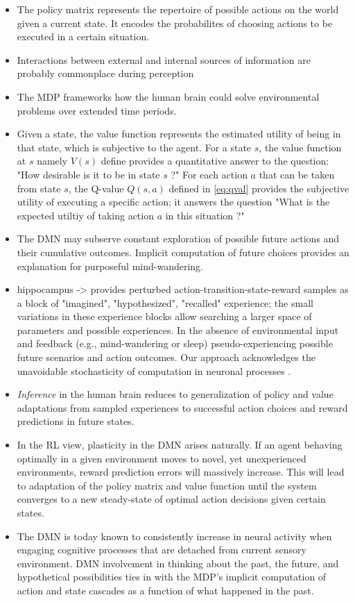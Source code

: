 \documentclass[10pt,letterpaper]{article}
\begin{document}
\begin{itemize}
  \item The policy matrix represents the repertoire of possible actions
  on the world given a current state. It encodes the probabilites of
  choosing actions to be executed in a certain situation.
  \item Interactions between external and internal sources of
  information are probably commonplace during perception
  \item The MDP frameworks how the human brain could solve
  environmental problems over extended time periods.
  \item Given a state, the value function represents the estimated utility of
  being in that state, which is subjective to the agent.
  For a state $s$, the value function at $s$ namely $V(s)$ define provides a quantitative answer to the question:
  "How desirable is it to be in state $s$ ?"
  For each action $a$ that can be taken from state $s$,
  the Q-value  $Q(s, a)$ defined in \eqref{eq:qval} provides the subjective
  utility of executing a specific action; it answers the question
  "What is the expected utiltiy of taking action $a$ in this situation ?"
  \item The DMN may subserve
  constant exploration of possible future actions and their
  cumulative outcomes. Implicit computation of future choices
  provides an explanation for purposeful mind-wandering.
  \item hippocampus -> provides perturbed action-transition-state-reward samples
  as a block of "imagined", "hypothesized", "recalled" experience;
  the small variations in these experience blocks allow searching
  a larger space of parameters and possible experiences.
  In the absence of environmental input and feedback
  (e.g., mind-wandering or sleep) pseudo-experiencing possible
  future scenarios and action outcomes.
  Our approach acknowledges the unavoidable stochasticity of
  computation in neuronal processes \citep{faisal2008noise}.
  \item
  \textit{Inference} in the human brain reduces to generalization of
  policy and value adaptations from sampled experiences to
  successful action choices and reward predictions in future states.
  \item In the RL view, plasticity in the DMN arises naturally.
  If an agent behaving optimally in a given environment moves
  to novel, yet unexperienced environments, reward prediction errors will
  massively increase. This will lead to adaptation of the policy matrix
  and value function until the system converges to a
  new steady-state of optimal action decisions given certain states.
  \item The DMN is today known to consistently increase in neural
  activity when engaging cognitive processes that are detached from
  current sensory environment. DMN involvement in thinking about the past,
  the future, and hypothetical possibilities ties in with the
  MDP's implicit computation of action and state cascades as a function
  of what happened in the past.
\end{itemize}
\end{document}

